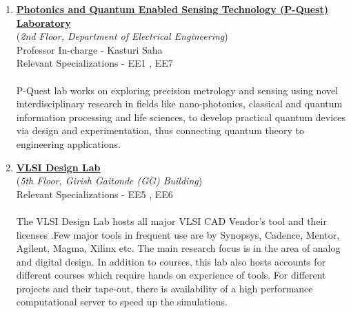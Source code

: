 \documentclass[openany]{book} %
\begin{document}
\begin{enumerate}
\item \href{http://www.ee.iitb.ac.in/~kasturis/index.php} {\color{blue} \textbf{Photonics and Quantum Enabled Sensing Technology (P-Quest) Laboratory}}\\
    (\textit{2nd Floor, Department of Electrical Engineering})\\
    Professor In-charge - Kasturi Saha\\
Relevant Specializations - EE1 , EE7\\
\\
P-Quest lab works on exploring precision metrology and sensing using novel interdisciplinary research in fields like nano-photonics, classical and quantum information processing and life sciences, to develop practical quantum devices via design and experimentation, thus connecting quantum theory to engineering applications.\\

\item \href{https://www.ee.iitb.ac.in/vlsi/} {\color{blue} \textbf{VLSI Design Lab}}\\
    (\textit{5th Floor, Girish Gaitonde (GG) Building})\\
Relevant Specializations - EE5 , EE6\\
\\
The VLSI Design Lab hosts all major VLSI CAD Vendor’s tool and their licenses .Few major tools in frequent use are by Synopsys, Cadence, Mentor, Agilent, Magma, Xilinx etc. The main research focus is in the area of analog and digital design. In addition to courses, this lab also hosts accounts for different courses which require hands on experience of tools. For different projects and their tape-out, there is availability of a high performance computational server to speed up the simulations.\\


\end{enumerate}
\end{document}
